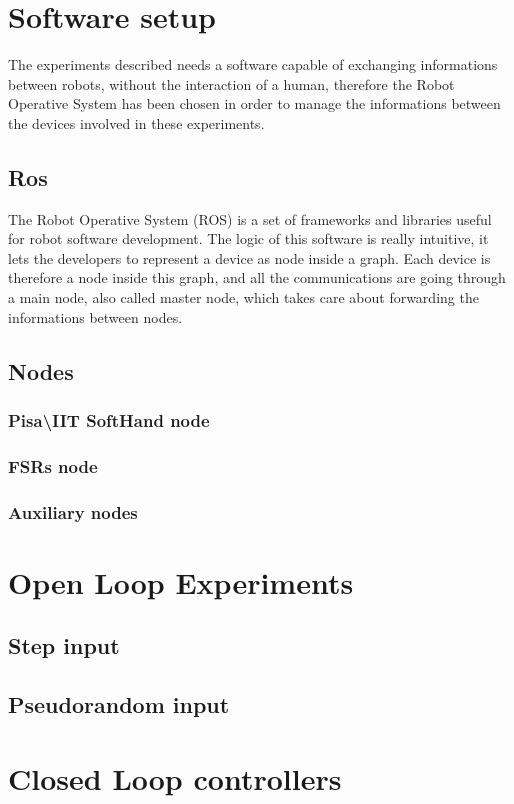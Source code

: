  



\chapter{Software setup}
The experiments described needs a software capable of exchanging informations between robots, without the interaction of a human, therefore the Robot Operative System has been chosen in order to manage the informations between the devices involved in these experiments.  
\section{Ros}
The Robot Operative System (ROS) is a set of frameworks and libraries useful for robot software development. The logic of this software is really intuitive, it lets the developers to represent a device as node inside a graph. Each device is therefore a node inside this graph, and all the communications are going through a main node, also called master node, which takes care about forwarding the informations between nodes.
\section{Nodes}
\subsection{Pisa\textbackslash IIT SoftHand node}
\subsection{FSRs node}
\subsection{Auxiliary nodes}

\chapter{Open Loop Experiments}
\section{Step input}
\section{Pseudorandom input}

\chapter{Closed Loop controllers}
